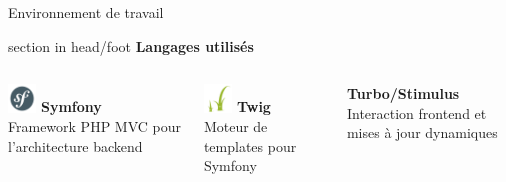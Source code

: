 \documentclass{beamer}
\begin{document}
\begin{frame}{Environnement de travail}
	\begin{beamercolorbox}[wd=\paperwidth,ht=1.5em,dp=0.5em,leftskip=0.5cm]{section in head/foot}
  		\large \textbf{Langages utilisés}
	\end{beamercolorbox}
	\vspace{0.5em}
	\begin{center}
		\begin{minipage}{0.9\textwidth}
  			\begin{columns}[T, onlytextwidth]
    
    					\vspace{2.5em}
      				\begin{minipage}[t][2cm][t]{\linewidth}
        					\raggedright
        					\includegraphics[height=0.75cm]{../img/logo_symfony.png}
        					\hspace{0.6cm} \textbf{Symfony} \\
        					Framework PHP MVC pour l'architecture backend
      				\end{minipage}
      				\vspace{0.7em}
          			\pause
      
      				\begin{minipage}[t][2cm][t]{\linewidth}
        					\raggedright
        					\includegraphics[height=0.75cm]{../img/logo_twig.png}
        					\hspace{0.6cm} \textbf{Twig} \\
        					Moteur de templates pour Symfony
      				\end{minipage}
          			\pause

    
      				\begin{minipage}[t][2cm][t]{\linewidth}
        					\raggedright
        					\textbf{Turbo/Stimulus} \\
        					Interaction frontend et mises à jour dynamiques
      				\end{minipage}
      				\vspace{0.7em}
          			\pause
      

\end{columns}
\end{minipage}
\end{center}
\end{frame}
\end{document}

